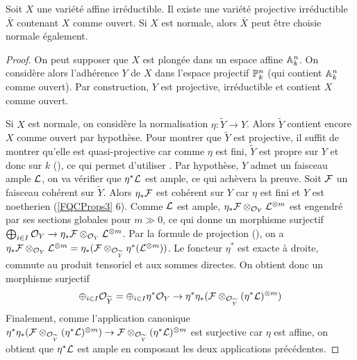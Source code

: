 \begin{lem}\label{CompletionNormal}
Soit $X$ une variété affine irréductible.
Il existe une variété projective irréductible $\bar{X}$ contenant $X$ comme ouvert. Si $X$ est normale, alors $\bar{X}$ peut être choisie normale également.
\end{lem}
\begin{proof}
On peut supposer que $X$ est plongée dans un espace affine $\mathbb{A}^n_k$. On considère alors l'adhérence $Y$ de $X$ dans l'espace projectif $\mathbb{P}^n_k$ (qui contient $\mathbb{A}^n_k$ comme ouvert). Par construction, $Y$ est projective, irréductible et contient $X$ comme ouvert.

Si $X$ est normale, on considère la normalisation $\eta:\widetilde{Y}\rightarrow Y$. Alors $\widetilde{Y}$ contient encore $X$ comme ouvert par hypothèse. Pour montrer que $\widetilde{Y}$ est projective, il suffit de montrer qu'elle est quasi-projective car comme $\eta$ est fini, $\widetilde{Y}$ est propre sur $Y$ et donc sur $k$ (\cite[II.4.8, ex II.4.1]{Hartshorne}), ce qui permet d'utiliser \cite[ex II.4.4]{Hartshorne}. Par hypothèse, $Y$ admet un faisceau ample $\mathcal{L}$, on va vérifier que $\eta^*\mathcal{L}$ est ample, ce qui achèvera la preuve. Soit $\mathcal{F}$ un faisceau cohérent sur $\widetilde{Y}$. Alors $\eta_*\mathcal{F}$ est cohérent sur $Y$ car $\eta$ est fini et $Y$ est noetherien (\ref{FQCProps3} 6). Comme $\mathcal{L}$ est ample, $\eta_*\mathcal{F}\otimes_{\mathcal{O}_Y} \mathcal{L}^{\otimes m}$ est engendré par ses sections globales pour $m\gg 0$, ce qui donne un morphisme surjectif $\bigoplus_{i\in I}\mathcal{O}_Y\rightarrow \eta_*\mathcal{F}\otimes_{\mathcal{O}_Y} \mathcal{L}^{\otimes m}$. Par la formule de projection (\cite[ex II.5.1.d]{Hartshorne}), on a $\eta_*\mathcal{F}\otimes_{\mathcal{O}_Y} \mathcal{L}^{\otimes m}=\eta_*(\mathcal{F}\otimes_{\mathcal{O}_{\widetilde{Y}}}\eta^*(\mathcal{L}^{\otimes m}))$. Le foncteur $\eta^*$ est exacte à droite, commute au produit tensoriel et aux sommes directes. On obtient donc un morphisme surjectif 
$$\oplus_{i\in I}\mathcal{O}_{\widetilde{Y}}=\oplus_{i\in I}\eta^*\mathcal{O}_Y\rightarrow \eta^*\eta_*(\mathcal{F}\otimes_{\mathcal{O}_{\widetilde{Y}}}(\eta^*\mathcal{L})^{\otimes m})$$
Finalement, comme l'application canonique $\eta^*\eta_*(\mathcal{F}\otimes_{\mathcal{O}_{\widetilde{Y}}}(\eta^*\mathcal{L})^{\otimes m})\rightarrow \mathcal{F}\otimes_{\mathcal{O}_{\widetilde{Y}}}(\eta^*\mathcal{L})^{\otimes m}$ est surjective car $\eta$ est affine, on obtient que $\eta^*\mathcal{L}$ est ample en composant les deux applications précédentes.
\end{proof}

